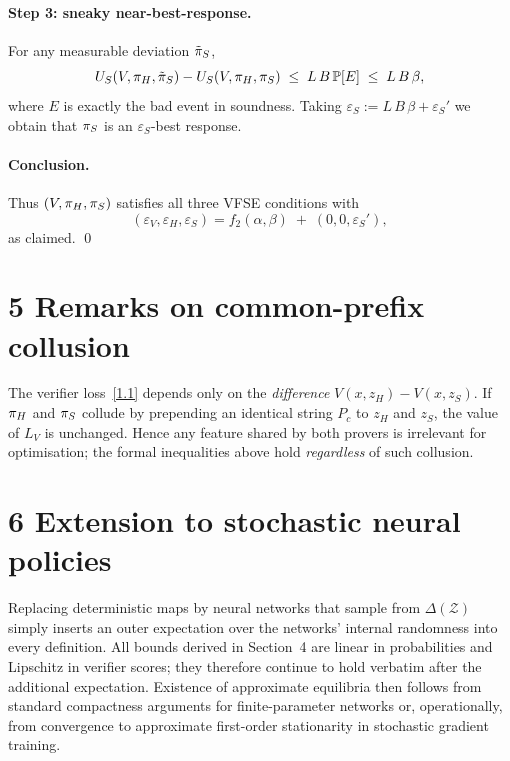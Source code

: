 \paragraph{Step 3: sneaky near-best-response.}
For any measurable deviation $\tilde{\pi}_S$,
\[
U_S(V,\pi_H,\tilde{\pi}_S)-U_S(V,\pi_H,\pi_S)
\;\le\;
L\,B\,\mathbb P[E]
\;\le\;
L\,B\,\beta,
\]
where $E$ is exactly the bad event in soundness.
Taking $\varepsilon_S:=L\,B\,\beta+\varepsilon_S'$ we obtain that
$\pi_S$ is an $\varepsilon_S$-best response.

\paragraph{Conclusion.}
Thus $(V,\pi_H,\pi_S)$ satisfies all three VFSE conditions with
\[
(\varepsilon_V,\varepsilon_H,\varepsilon_S)
=
f_2(\alpha,\beta)\;+\;(0,0,\varepsilon_S'),
\]
as claimed.  \qed

\section*{5 \; Remarks on common-prefix collusion}

The verifier loss~\eqref{1.1} depends only on the \emph{difference}
$V(x,z_H)-V(x,z_S)$.
If $\pi_H$ and $\pi_S$ collude by prepending an identical string
$P_c$ to $z_H$ and $z_S$, the value of $L_V$ is unchanged.
Hence any feature shared by both provers is irrelevant for optimisation;
the formal inequalities above hold \emph{regardless} of such collusion.

\section*{6 \; Extension to stochastic neural policies}

Replacing deterministic maps by neural networks that sample from
$\Delta(\mathcal Z)$ simply inserts an outer expectation
over the networks’ internal randomness into every definition.
All bounds derived in Section~4 are linear in probabilities
and Lipschitz in verifier scores; they therefore continue to hold
verbatim after the additional expectation.
Existence of approximate equilibria then follows from standard
compactness arguments for finite-parameter networks or,
operationally, from convergence to approximate first-order stationarity
in stochastic gradient training.

\bigskip
\begin{flushright}
\qedsymbol
\end{flushright}
